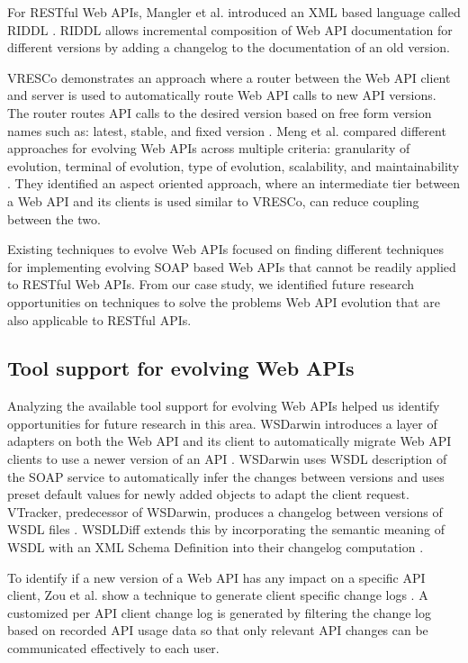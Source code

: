 For RESTful Web APIs, Mangler et al. introduced an XML based language called RIDDL \cite{mangler2010origin}. RIDDL allows incremental composition of Web API documentation for different versions by adding a changelog to the documentation of an old version.

VRESCo demonstrates an approach where a router between the Web API client and server is used to automatically route Web API calls to new API versions. The router routes API calls to the desired version based on free form version names such as: latest, stable, and fixed version \cite{leitner2008end}. Meng et al. compared different approaches for evolving Web APIs across multiple criteria: granularity of evolution, terminal of evolution, type of evolution, scalability, and maintainability \cite{6835564}. They identified an aspect oriented approach, where an intermediate tier between a Web API and its clients is used similar to VRESCo, can reduce coupling between the two.

Existing techniques to evolve Web APIs focused on finding different techniques for implementing evolving SOAP based Web APIs that cannot be readily applied to RESTful Web APIs. From our case study, we identified future research opportunities on techniques to solve the problems Web API evolution that are also applicable to RESTful APIs.

\subsection{Tool support for evolving Web APIs} %
\label{sub:tool_development}


Analyzing the available tool support for evolving Web APIs helped us identify opportunities for future research in this area. WSDarwin introduces a layer of adapters on both the Web API and its client to automatically migrate Web API clients to use a newer version of an API \cite{WSDarwin}. WSDarwin uses WSDL description of the SOAP service to automatically infer the changes between versions and uses preset default values for newly added objects to adapt the client request. VTracker, predecessor of WSDarwin, produces a changelog between versions of WSDL files \cite{fokaefs_2011_empirical}. WSDLDiff extends this by incorporating the semantic meaning of WSDL with an XML Schema Definition into their changelog computation \cite{wsdl_diff_2012}.

To identify if a new version of a Web API has any impact on a specific API client,  Zou et al. show a technique to generate client specific change logs \cite{le2008synchronizing}. A customized per API client change log is generated by filtering the change log based on  recorded API usage data so that only relevant API changes can be communicated effectively to each user.

